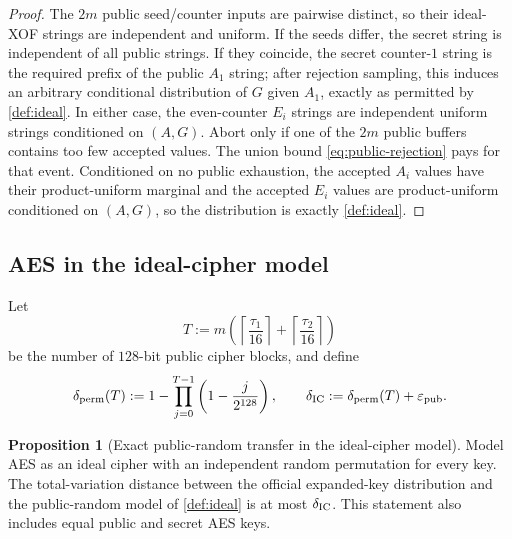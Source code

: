 \documentclass[11pt,a4paper]{article}
\theoremstyle{definition}
\newtheorem{proposition}[theorem]{Proposition}
\theoremstyle{remark}
\begin{document}
\begin{proof}
The $2m$ public seed/counter inputs are pairwise distinct, so their ideal-XOF strings are independent and uniform.  If the seeds differ, the secret string is independent of all public strings.  If they coincide, the secret counter-$1$ string is the required prefix of the public $A_1$ string; after rejection sampling, this induces an arbitrary conditional distribution of $G$ given $A_1$, exactly as permitted by \cref{def:ideal}.  In either case, the even-counter $E_i$ strings are independent uniform strings conditioned on $(A,G)$.  Abort only if one of the $2m$ public buffers contains too few accepted values.  The union bound \eqref{eq:public-rejection} pays for that event.  Conditioned on no public exhaustion, the accepted $A_i$ values have their product-uniform marginal and the accepted $E_i$ values are product-uniform conditioned on $(A,G)$, so the distribution is exactly \cref{def:ideal}.
\end{proof}

\subsection{AES in the ideal-cipher model}

Let
\[
T:=m\left(\left\lceil\frac{\tau_1}{16}\right\rceil
          +\left\lceil\frac{\tau_2}{16}\right\rceil\right)
\]
be the number of $128$-bit public cipher blocks, and define
\begin{equation}\label{eq:ideal-cipher-distance}
\delta_{\rm perm}(T)
:=1-\prod_{j=0}^{T-1}\left(1-\frac{j}{2^{128}}\right),
\qquad
\delta_{\rm IC}:=\delta_{\rm perm}(T)+\varepsilon_{\rm pub}.
\end{equation}

\begin{proposition}[Exact public-random transfer in the ideal-cipher model]\label{prop:icm-transfer}
Model AES as an ideal cipher with an independent random permutation for every key.  The total-variation distance between the official expanded-key distribution and the public-random model of \cref{def:ideal} is at most $\delta_{\rm IC}$.  This statement also includes equal public and secret AES keys.
\end{proposition}
\end{document}
